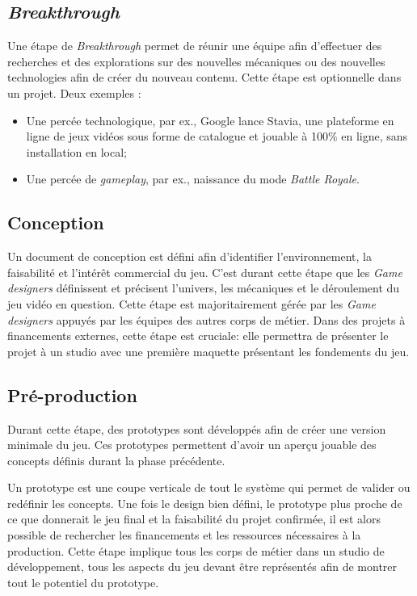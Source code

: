\subsection{\emph{Breakthrough}}

Une étape de \emph{Breakthrough} permet de réunir une équipe afin d'effectuer des recherches et des explorations sur des nouvelles mécaniques ou des nouvelles technologies afin de créer du nouveau contenu.
Cette étape est optionnelle dans un projet.
Deux exemples :
\begin{itemize}
    \item Une percée technologique, par ex., Google lance Stavia, une plateforme en ligne de jeux vidéos sous forme de catalogue et jouable à 100\% en ligne, sans installation en local;
    \item Une percée de \emph{gameplay}, par ex., naissance du mode \emph{Battle Royale}.
\end{itemize}

\subsection{Conception}

Un document de conception est défini afin d'identifier l'environnement, la faisabilité et l'intérêt commercial du jeu.
C'est durant cette étape que les \emph{Game designers} définissent et précisent l'univers, les mécaniques et le déroulement du jeu vidéo en question.
Cette étape est majoritairement gérée par les \emph{Game designers} appuyés par les équipes des autres corps de métier.
Dans des projets à financements externes, cette étape est cruciale: elle permettra de présenter le projet à un studio avec une première maquette présentant les fondements du jeu.

\subsection{Pré-production}
Durant cette étape, des prototypes sont développés afin de créer une version minimale du jeu.
Ces prototypes permettent d'avoir un aperçu jouable des concepts définis durant la phase précédente. 

Un prototype est une coupe verticale de tout le système qui permet de valider ou redéfinir les concepts.
Une fois le design bien défini, le prototype plus proche de ce que donnerait le jeu final et la faisabilité du projet confirmée, il est alors possible de rechercher les financements et les ressources nécessaires à la production.
Cette étape implique tous les corps de métier dans un studio de développement, tous les aspects du jeu devant être représentés afin de montrer tout le potentiel du prototype.

